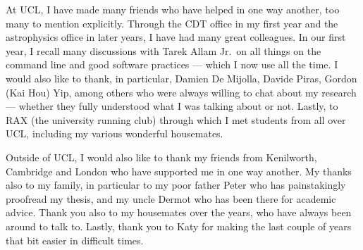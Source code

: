 \begin{acknowledgements}
	At UCL, I have made many friends who have helped in one way another, too many to mention explicitly.
	Through the CDT office in my first year and the astrophysics office in later years, I have had many great colleagues.
	In our first year, I recall many discussions with Tarek Allam Jr.\ on all things on the command line and good software practices --- which I now use all the time.
	I would also like to thank, in particular, Damien De Mijolla, Davide Piras, Gordon (Kai Hou) Yip, among others who were always willing to chat about my research --- whether they fully understood what I was talking about or not.
	Lastly, to RAX (the university running club) through which I met students from all over UCL, including my various wonderful housemates.

	Outside of UCL, I would also like to thank my friends from Kenilworth, Cambridge and London who have supported me in one way another.
	My thanks also to my family, in particular to my poor father Peter who has painstakingly proofread my thesis, and my uncle Dermot who has been there for academic advice.
	Thank you also to my housemates over the years, who have always been around to talk to.
	Lastly, thank you to Katy for making the last couple of years that bit easier in difficult times.
\end{acknowledgements}

\setcounter{tocdepth}{2}

\tableofcontents
\listoffigures
\listoftables
